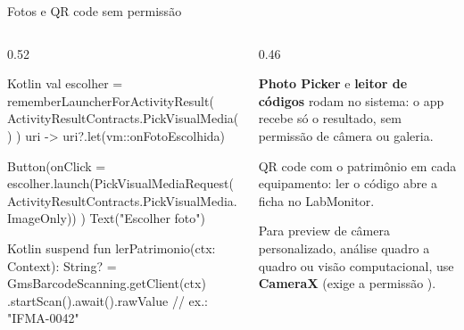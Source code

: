 \documentclass[aspectratio=169,10pt]{beamer}
\begin{document}
\begin{frame}[fragile]{Fotos e QR code sem permissão}
  \begin{columns}[T]
    \begin{column}{0.52\textwidth}
\begin{codigo}[title=Seletor de fotos (Photo Picker)]{Kotlin}
val escolher = rememberLauncherForActivityResult(
  ActivityResultContracts.PickVisualMedia()
) { uri -> uri?.let(vm::onFotoEscolhida) }

Button(onClick = {
  escolher.launch(PickVisualMediaRequest(
    ActivityResultContracts.PickVisualMedia.ImageOnly))
}) { Text("Escolher foto") }
\end{codigo}
\begin{codigo}[title=Leitor de QR code (Google Play services)]{Kotlin}
suspend fun lerPatrimonio(ctx: Context): String? =
  GmsBarcodeScanning.getClient(ctx)
    .startScan().await().rawValue  // ex.: "IFMA-0042"
\end{codigo}
    \end{column}
    \begin{column}{0.46\textwidth}
      \begin{conceito}
        \textbf{Photo Picker} e \textbf{leitor de códigos} rodam no sistema: o app recebe só o resultado, sem permissão de câmera ou galeria.
      \end{conceito}
      \begin{dica}
        QR code com o patrimônio em cada equipamento: ler o código abre a ficha no LabMonitor.
      \end{dica}
      \begin{dica}
        Para preview de câmera personalizado, análise quadro a quadro ou visão computacional, use \textbf{CameraX} (exige a permissão ).
      \end{dica}
    \end{column}
  \end{columns}
\end{frame}
\end{document}
